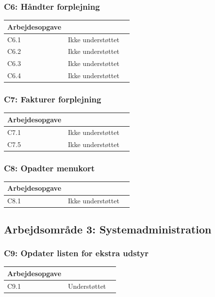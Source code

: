 \subsubsection{C6: Håndter forplejning}
\begin{tabular}{ | l | r | p{} |}
	\hline
	Arbejdesopgave & \\ 
\hline
	C6.1 & Ikke understøttet \\ 
\hline
	C6.2 & Ikke understøttet \\ 
\hline
	C6.3 & Ikke understøttet \\ 
\hline
	C6.4 & Ikke understøttet \\ 
\hline
\end{tabular}

\subsubsection{C7: Fakturer forplejning}
\begin{tabular}{ | l | r | p{} |}
	\hline
	Arbejdesopgave & \\ 
\hline
	C7.1 & Ikke understøttet \\ 
\hline
	C7.5 & Ikke understøttet \\ 
\hline
\end{tabular}

\subsubsection{C8: Opadter menukort}
\begin{tabular}{ | l | r | p{} |}
	\hline
	Arbejdesopgave & \\ 
\hline
	C8.1 & Ikke understøttet \\ 
\hline
\end{tabular}

\subsection{Arbejdsområde 3: Systemadministration}
\label{Baggrund_Arb_opgaver_Systemadmin}
\subsubsection{C9: Opdater listen for ekstra udstyr}
\begin{tabular}{ | l | r | p{} |}
	\hline
	Arbejdesopgave & \\ 
\hline
	C9.1 & Understøttet \\ 
\hline
\end{tabular}

